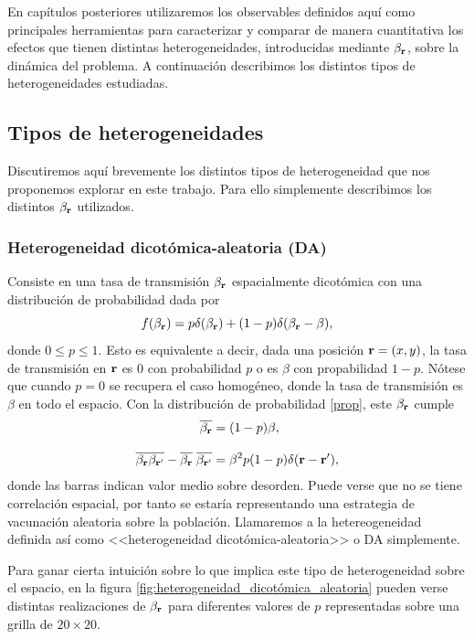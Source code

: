 En capítulos posteriores utilizaremos los observables definidos aquí como principales herramientas para caracterizar y comparar de manera cuantitativa
los efectos que tienen distintas heterogeneidades, introducidas mediante $\beta_{\vb r}$, sobre la dinámica del problema. A continuación describimos los distintos
tipos de heterogeneidades estudiadas. 

\subsection*{Tipos de heterogeneidades}

Discutiremos aquí brevemente los distintos tipos de heterogeneidad que nos proponemos explorar en este trabajo. Para ello simplemente describimos los distintos 
$\beta_{\vb r}$ utilizados.
\subsubsection*{Heterogeneidad dicotómica-aleatoria (DA)}

Consiste en una tasa de transmisión $\beta_{\vb r}$ espacialmente dicotómica con una distribución de probabilidad dada por 
\begin{equation}
  f(\beta_{\vb r}) = p\delta(\beta_{\vb r}) + (1-p)\delta(\beta_{\vb r}-\beta),\label{prop}
\end{equation}
donde $0\leq p \leq 1$. Esto es equivalente a decir, dada una posición $\vb r = (x,y)$, la tasa de transmisión en $\vb r$ es $0$ con probabilidad $p$ o
es $\beta$ con propabilidad $1-p$. Nótese que cuando $p=0$ se recupera el caso homogéneo,
donde la tasa de transmisión es $\beta$ en todo el espacio. Con la distribución de probabilidad \ref{prop}, 
este $\beta_{\vb r}$ cumple 
\begin{align}
  \overline{\beta_{\vb{r}}}&= (1-p)\beta, \\[.3cm]
  \overline{\beta_{\vb r}\beta_{\vb{r'}}} - \overline{\beta_{\vb{r}}}\;\overline{\beta_{\vb{r'}}} &= \beta^2p(1-p)\delta(\vb r - \vb{r'}),
\end{align}
donde las barras indican valor medio sobre desorden. Puede verse que no se tiene correlación espacial, por tanto se estaría representando una estrategia de vacunación 
aleatoria sobre la población. Llamaremos a la hetereogeneidad definida así como <<heterogeneidad
dicotómica-aleatoria>> o DA simplemente.

Para ganar cierta intuición sobre lo que implica este tipo de heterogeneidad sobre el espacio, en la figura \ref{fig:heterogeneidad_dicotómica_aleatoria} 
pueden verse distintas realizaciones de $\beta_{\vb r}$ para diferentes valores de $p$ representadas sobre una grilla de $20 \times 20$.

